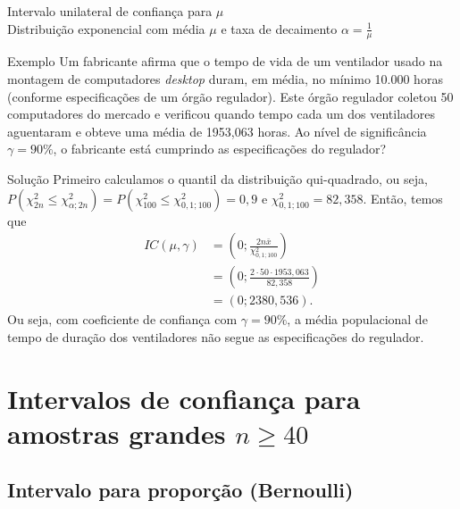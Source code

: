 \documentclass[8pt]{beamer}
\begin{document}
\begin{frame}{Intervalo unilateral de confiança para $\mu$\\ Distribuição exponencial com média $\mu$ e taxa de decaimento $\alpha=\frac{1}{\mu}$}

\small

\begin{block}{Exemplo}
	Um fabricante afirma que o tempo de vida de um ventilador usado na montagem de computadores \textit{desktop} duram, em média, no mínimo 10.000 horas (conforme especificações de um órgão regulador). Este órgão regulador coletou 50 computadores do mercado e verificou quando tempo cada um dos ventiladores aguentaram e obteve uma média de 1953,063 horas. Ao nível de significância $\gamma=90\%$, o fabricante está cumprindo as especificações do regulador?
\end{block}

\begin{block}{Solução}
	Primeiro calculamos o quantil da distribuição qui-quadrado, ou seja, $P(\chi^2_{2n} \leq \chi_{\alpha;2n}^{2}) = P(\chi^2_{100} \leq \chi_{0,1;100}^{2}) = 0,9$ e $\chi_{0,1;100}^{2} = 82,358$. Então, temos que
	\begin{align*}
		IC(\mu, \gamma) &= \left( 0; \frac{2 n \bar{x}}{\chi_{0,1;100}^{2}} \right)\\
		&= \left( 0; \frac{2 \cdot 50\cdot 1953,063}{82,358} \right)\\
		&= \left( 0; 2380,536 \right).
	\end{align*}
	Ou seja, com coeficiente de confiança com $\gamma=90\%$, a média populacional de tempo de duração dos ventiladores não segue as especificações do regulador.
\end{block}

\normalsize

\end{frame}

\section{Intervalos de confiança para amostras grandes $n \geq 40$}

\subsection{Intervalo para proporção (Bernoulli)}
\end{document}
